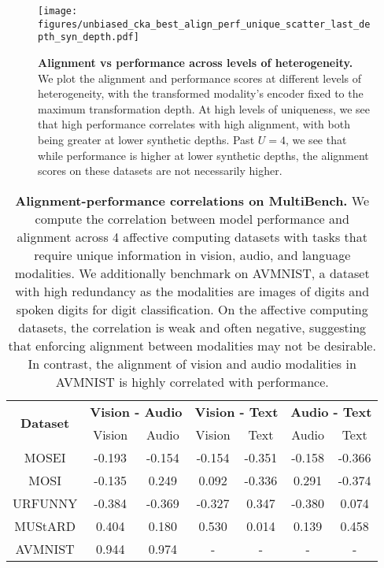 \begin{figure*}[t!]
    \centering
    \texttt{[image: figures/unbiased\_cka\_best\_align\_perf\_unique\_scatter\_last\_depth\_syn\_depth.pdf]}
    \vspace{-2em}
    \caption{\textbf{Alignment vs performance across levels of heterogeneity.} We plot the alignment and performance scores at different levels of heterogeneity, with the transformed modality's encoder fixed to the maximum transformation depth. At high levels of uniqueness, we see that high performance correlates with high alignment, with both being greater at lower synthetic depths. Past $U=4$, we see that while performance is higher at lower synthetic depths, the alignment scores on these datasets are not necessarily higher.}
    \label{fig:align_perf_het_scatter}
\end{figure*}


\begin{table*}[ht]
\centering
\begin{tabular}{c|c|c|c|c|c|c}
\hline
\multirow{2}{*}{\textbf{Dataset}} & \multicolumn{2}{c|}{\textbf{Vision - Audio}} & \multicolumn{2}{c|}{\textbf{Vision - Text}} & \multicolumn{2}{c}{\textbf{Audio - Text}} \\ \cline{2-7}
& Vision & Audio & Vision & Text & Audio & Text \\ \hline
MOSEI \cite{bagher_zadeh_multimodal_2018} &-0.193 & -0.154 & -0.154 & -0.351 & -0.158 &-0.366 \\
MOSI \cite{zadeh_mosi_2016} & -0.135 & 0.249 & 0.092 & -0.336 & 0.291 & -0.374 \\
URFUNNY \cite{hasan_ur-funny_2019} & -0.384 & -0.369 & -0.327 & 0.347 & -0.380 & 0.074 \\
MUStARD \cite{castro_towards_2019} & 0.404&  0.180 & 0.530 &  0.014 & 0.139 & 0.458 \\
AVMNIST \cite{perez-rua_mfas_2019}& 0.944 & 0.974 & - & - & - & - \\
\hline
\end{tabular}
\vspace{-2mm}
\caption{\textbf{Alignment-performance correlations on MultiBench.} We compute the correlation between model performance and alignment across 4 affective computing datasets with tasks that require unique information in vision, audio, and language modalities. We additionally benchmark on AVMNIST, a dataset with high redundancy as the modalities are images of digits and spoken digits for digit classification. On the affective computing datasets, the correlation is weak and often negative, suggesting that enforcing alignment between modalities may not be desirable. In contrast, the alignment of vision and audio modalities in AVMNIST is highly correlated with performance.}
\label{fig:real_correlation}
\vspace{-1em}
\end{table*}

